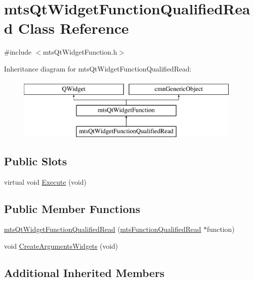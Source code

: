 \hypertarget{classmts_qt_widget_function_qualified_read}{}\section{mts\+Qt\+Widget\+Function\+Qualified\+Read Class Reference}
\label{classmts_qt_widget_function_qualified_read}


{\ttfamily \#include $<$mts\+Qt\+Widget\+Function.\+h$>$}

Inheritance diagram for mts\+Qt\+Widget\+Function\+Qualified\+Read\+:\begin{figure}[H]
\begin{center}
\leavevmode
\includegraphics[height=3.000000cm]{dc/da7/classmts_qt_widget_function_qualified_read}
\end{center}
\end{figure}
\subsection*{Public Slots}
\begin{DoxyCompactItemize}
\item 
virtual void \hyperlink{classmts_qt_widget_function_qualified_read_ac127b467c859d1272a7c45f9d3a83ca3}{Execute} (void)
\end{DoxyCompactItemize}
\subsection*{Public Member Functions}
\begin{DoxyCompactItemize}
\item 
\hyperlink{classmts_qt_widget_function_qualified_read_af9671731059bdac11d0fd0acb911fb97}{mts\+Qt\+Widget\+Function\+Qualified\+Read} (\hyperlink{classmts_function_qualified_read}{mts\+Function\+Qualified\+Read} $\ast$function)
\item 
void \hyperlink{classmts_qt_widget_function_qualified_read_a1c7d546a6894bcb7f19243e416178e49}{Create\+Arguments\+Widgets} (void)
\end{DoxyCompactItemize}
\subsection*{Additional Inherited Members}



